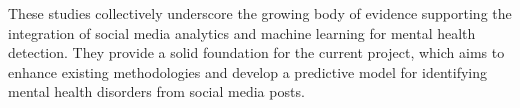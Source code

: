 \noindent
These studies collectively underscore the growing body of evidence supporting the integration of social media analytics and machine learning for mental health detection. They provide a solid foundation for the current project, which aims to enhance existing methodologies and develop a predictive model for identifying mental health disorders from social media posts.


